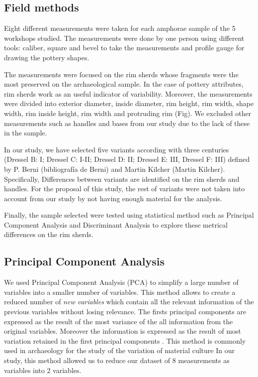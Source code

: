 \documentclass[review]{elsarticle}
\begin{document}


\subsection{Field methods}


Eight different measurements were taken for each amphorae sample of the 5 workshops studied. The measurements were done by one person using different tools: caliber, square and bevel to take the measurements and profile gauge for drawing the pottery shapes. 

The measurements were focused on the rim sherds whose fragments were the most preserved on the archaeological sample. In the case of pottery attributes, rim sherds work as an useful indicator of variability. Moreover, the measurements were divided into exterior diameter, inside diameter, rim height, rim width, shape width, rim inside height, rim width and protruding rim (Fig). We excluded other measurements such as handles and bases from our study due to the lack of these in the sample.    

In our study, we have selected five variants according with three centuries (Dressel B: I; Dressel C: I-II; Dressel D: II; Dressel E: III, Dressel F: III) defined by P. Berni (bibliografía de Berni) and Martin Kilcher (Martin Kilcher). Specifically, Differences between variants are identified on the rim sherds and handles. For the proposal of this study, the rest of variants were not taken into account from our study by not having enough material for the analysis. 

Finally, the sample selected were tested using statistical method such as Principal Component Analysis and Discriminant Analysis to explore these metrical differences on the rim sherds. 
 

\subsection{Principal Component Analysis}


We used Principal Component Analysis (PCA) to simplify a large number of variables into a smaller number of variables. This method allows to create a reduced number of \textit{new variables} which contain all the relevant information of the previous variables without losing relevance. The firsts principal components are expressed as the result of the most variance of the all information from the original variables. Moreover the information is expressed as the result of most variation retained in the first principal components \citep{jolliffe_principal_2002, shennan_quantifying_1997}. 
This method is commonly used in archaeology for the study of the variation of material culture \citep{li_crossbows_2014, schillinger_differences_2016} 
In our study, this method allowed us to reduce our dataset of 8 measurements as variables into 2 variables. 
\end{document}
